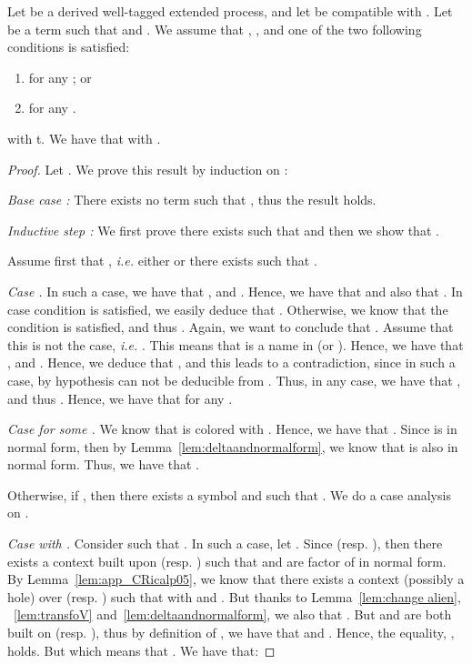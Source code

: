 \begin{lemma}
\label{lem:samerecipesymmetric}
Let  be a derived well-tagged extended process, and let  be compatible with .
Let   be a term such that  and . We assume that 
, 
 , and
one of the two following conditions
is satisfied: 
\begin{enumerate}
\item   for any ; or
\item   for any {.} 
\end{enumerate}
with t. 
We have that  with .
\end{lemma}

\begin{proof}
Let .
We prove this result by induction on :

\medskip

\noindent\emph{Base case :} There exists no term  such that , thus the result holds.

\medskip

\noindent\emph{Inductive step :} We first prove there exists  such that  and then we show that
.

\medskip{}

Assume first that , \emph{i.e.} either  or there exists  such that . 

\noindent \emph{Case .} In such a case, we have that
, and . Hence, we have that 
 and also that . {In case condition  is
satisfied, we easily deduce that . Otherwise, we know
that the condition  is satisfied, and thus . Again, we want to conclude
that . Assume that this is not the case, \emph{i.e.} . This means that  is a name in  (or
). Hence, we  have that , and {}. Hence, we
deduce that , and this leads to a
contradiction, since in such a case, by hypothesis  can not be deducible from .} 
Thus, in any case, we have that  , and
thus .
Hence, we have that 
 for any .

\noindent \emph{Case  for some .} 
We know that  is colored with . Hence, we have
that  . Since  is in normal form, then by
Lemma~\ref{lem:deltaandnormalform}, 
we know that  is also in
normal form. Thus, we have that .

\medskip{}

Otherwise, if , then there exists a symbol  and  such that . We do a case analysis on .

\smallskip{}

\emph{Case  with .} Consider  such that . In such a case, let . Since  (resp. ), then there exists a
context  built upon  (resp. ) such that  and
 are factor of  in normal form. By
Lemma~\ref{lem:app_CRicalp05}, we know that there exists a context  (possibly
a hole) over  (resp. ) such that  with  and . But
thanks to Lemma~\ref{lem:change alien}, ~\ref{lem:transfoV} and~\ref{lem:deltaandnormalform}, we also that . But  and  are both built on  (resp. ), thus by definition of , we have that
 and . Hence, the
equality, ,
holds. But  which means that
.
We have that:
 

\end{proof}
